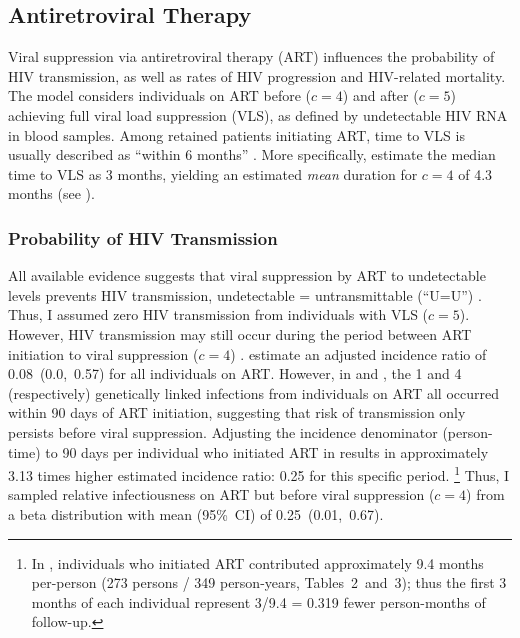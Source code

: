 \subsection{Antiretroviral Therapy}\label{model.par.art}
Viral suppression via antiretroviral therapy (ART) influences
the probability of HIV transmission, as well as rates of HIV progression and HIV-related mortality.
The model considers individuals on ART before ($c=4$) and after ($c=5$)
achieving full viral load suppression (VLS), as defined by undetectable HIV RNA in blood samples.
Among retained patients initiating ART, time to VLS
is usually described as ``within 6 months'' \cite{Thompson2012}.
More specifically, \citet{Mujugira2016} estimate the median time to VLS as 3 months,
yielding an estimated \emph{mean} duration for $c=4$ of 4.3 months (see ).
\subsubsection{Probability of HIV Transmission}\label{model.par.art.beta}
All available evidence suggests that viral suppression by ART to undetectable levels
prevents HIV transmission, \ie undetectable = untransmittable (``U=U'') \cite{Eisinger2019}.
Thus, I assumed zero HIV transmission from individuals with VLS ($c=5$).
However, HIV transmission may still occur
during the period between ART initiation to viral suppression ($c=4$) \cite{Mujugira2016}.
\citet{Donnell2010} estimate an adjusted incidence ratio of 0.08~(0.0,~0.57) for all individuals on ART.
However, in \cite{Donnell2010} and \cite{Cohen2016}, the 1 and 4 (respectively)
genetically linked infections from individuals on ART all occurred within 90 days of ART initiation,
suggesting that risk of transmission only persists before viral suppression.
Adjusting the incidence denominator (person-time)
to 90 days per individual who initiated ART in \cite{Donnell2010}
results in approximately 3.13 times higher estimated incidence ratio: 0.25 for this specific period.%
\footnote{In \cite{Donnell2010}, individuals who initiated ART contributed
  approximately 9.4 months per-person (273 persons / 349 person-years, Tables~2~and~3);
  thus the first 3 months of each individual represent
  3/9.4 = 0.319 fewer person-months of follow-up.}
Thus, I sampled relative infectiousness on ART but before viral suppression ($c=4$)
from a beta distribution with mean (95\%~CI) of 0.25~(0.01,~0.67).

